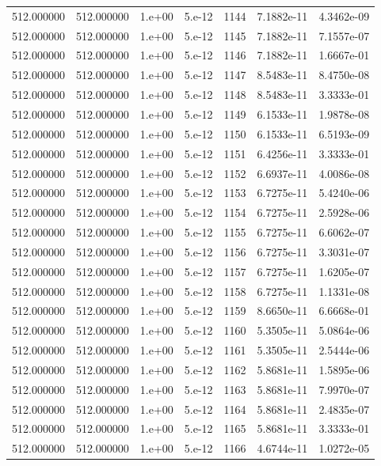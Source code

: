\begin{table}[htbp]
\begin{tabular}{rrrrrrr}
512.000000 & 512.000000 & 1.e+00 & 5.e-12 & 1144 & 7.1882e-11 & 4.3462e-09 \\
512.000000 & 512.000000 & 1.e+00 & 5.e-12 & 1145 & 7.1882e-11 & 7.1557e-07 \\
512.000000 & 512.000000 & 1.e+00 & 5.e-12 & 1146 & 7.1882e-11 & 1.6667e-01 \\
512.000000 & 512.000000 & 1.e+00 & 5.e-12 & 1147 & 8.5483e-11 & 8.4750e-08 \\
512.000000 & 512.000000 & 1.e+00 & 5.e-12 & 1148 & 8.5483e-11 & 3.3333e-01 \\
512.000000 & 512.000000 & 1.e+00 & 5.e-12 & 1149 & 6.1533e-11 & 1.9878e-08 \\
512.000000 & 512.000000 & 1.e+00 & 5.e-12 & 1150 & 6.1533e-11 & 6.5193e-09 \\
512.000000 & 512.000000 & 1.e+00 & 5.e-12 & 1151 & 6.4256e-11 & 3.3333e-01 \\
512.000000 & 512.000000 & 1.e+00 & 5.e-12 & 1152 & 6.6937e-11 & 4.0086e-08 \\
512.000000 & 512.000000 & 1.e+00 & 5.e-12 & 1153 & 6.7275e-11 & 5.4240e-06 \\
512.000000 & 512.000000 & 1.e+00 & 5.e-12 & 1154 & 6.7275e-11 & 2.5928e-06 \\
512.000000 & 512.000000 & 1.e+00 & 5.e-12 & 1155 & 6.7275e-11 & 6.6062e-07 \\
512.000000 & 512.000000 & 1.e+00 & 5.e-12 & 1156 & 6.7275e-11 & 3.3031e-07 \\
512.000000 & 512.000000 & 1.e+00 & 5.e-12 & 1157 & 6.7275e-11 & 1.6205e-07 \\
512.000000 & 512.000000 & 1.e+00 & 5.e-12 & 1158 & 6.7275e-11 & 1.1331e-08 \\
512.000000 & 512.000000 & 1.e+00 & 5.e-12 & 1159 & 8.6650e-11 & 6.6668e-01 \\
512.000000 & 512.000000 & 1.e+00 & 5.e-12 & 1160 & 5.3505e-11 & 5.0864e-06 \\
512.000000 & 512.000000 & 1.e+00 & 5.e-12 & 1161 & 5.3505e-11 & 2.5444e-06 \\
512.000000 & 512.000000 & 1.e+00 & 5.e-12 & 1162 & 5.8681e-11 & 1.5895e-06 \\
512.000000 & 512.000000 & 1.e+00 & 5.e-12 & 1163 & 5.8681e-11 & 7.9970e-07 \\
512.000000 & 512.000000 & 1.e+00 & 5.e-12 & 1164 & 5.8681e-11 & 2.4835e-07 \\
512.000000 & 512.000000 & 1.e+00 & 5.e-12 & 1165 & 5.8681e-11 & 3.3333e-01 \\
512.000000 & 512.000000 & 1.e+00 & 5.e-12 & 1166 & 4.6744e-11 & 1.0272e-05 \\

\end{tabular}
\end{table}
